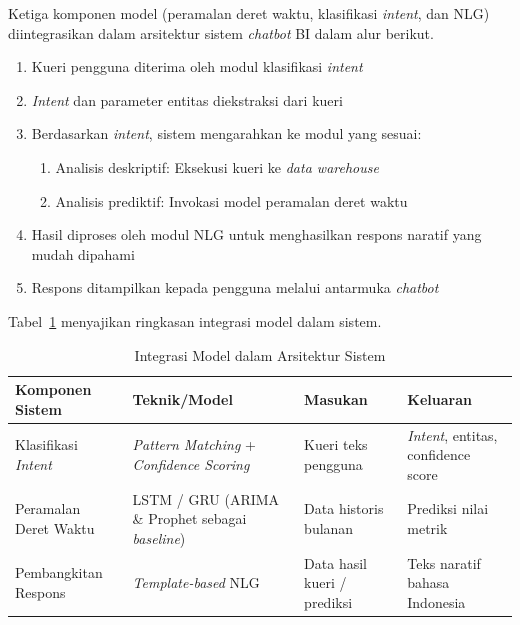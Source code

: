 Ketiga komponen model (peramalan deret waktu, klasifikasi \textit{intent}, dan NLG) diintegrasikan dalam arsitektur sistem \textit{chatbot} BI dalam alur berikut.

\begin{enumerate}
    \item Kueri pengguna diterima oleh modul klasifikasi \textit{intent}
    \item \textit{Intent} dan parameter entitas diekstraksi dari kueri
    \item Berdasarkan \textit{intent}, sistem mengarahkan ke modul yang sesuai:
    \begin{enumerate}
        \item Analisis deskriptif: Eksekusi kueri ke \textit{data warehouse}
        \item Analisis prediktif: Invokasi model peramalan deret waktu
    \end{enumerate}
    \item Hasil diproses oleh modul NLG untuk menghasilkan respons naratif yang mudah dipahami
    \item Respons ditampilkan kepada pengguna melalui antarmuka \textit{chatbot}
\end{enumerate}

Tabel~\ref{tab:integrasi-model} menyajikan ringkasan integrasi model dalam sistem.

\begin{table}[htbp]
\centering
\caption{Integrasi Model dalam Arsitektur Sistem}
\label{tab:integrasi-model}
\begin{tabular}{|p{3cm}|p{3.5cm}|p{3cm}|p{3cm}|}
\hline
\textbf{Komponen Sistem} & \textbf{Teknik/Model} & \textbf{Masukan} & \textbf{Keluaran} \\
\hline
Klasifikasi \textit{Intent} & \textit{Pattern Matching} + \textit{Confidence Scoring} & Kueri teks pengguna & \textit{Intent}, entitas, confidence score \\
\hline
Peramalan Deret Waktu & LSTM / GRU (ARIMA \& Prophet sebagai \textit{baseline}) & Data historis bulanan & Prediksi nilai metrik \\
\hline
Pembangkitan Respons & \textit{Template-based} NLG & Data hasil kueri / prediksi & Teks naratif bahasa Indonesia \\
\hline
\end{tabular}
\end{table}











